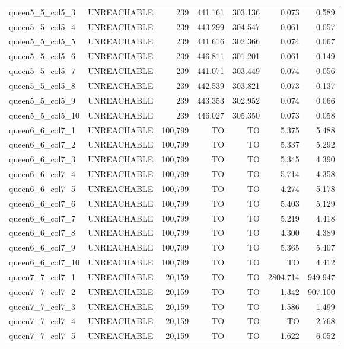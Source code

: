 \begin{tabular}{llr|rrrr}
  queen5\_5\_col5\_3 & UNREACHABLE & 239 & 441.161 & 303.136 & 0.073 & 0.589 \\
  queen5\_5\_col5\_4 & UNREACHABLE & 239 & 443.299 & 304.547 & 0.061 & 0.057 \\
  queen5\_5\_col5\_5 & UNREACHABLE & 239 & 441.616 & 302.366 & 0.074 & 0.067 \\
  queen5\_5\_col5\_6 & UNREACHABLE & 239 & 446.811 & 301.201 & 0.061 & 0.149 \\
  queen5\_5\_col5\_7 & UNREACHABLE & 239 & 441.071 & 303.449 & 0.074 & 0.056 \\
  queen5\_5\_col5\_8 & UNREACHABLE & 239 & 442.539 & 303.821 & 0.073 & 0.137 \\
  queen5\_5\_col5\_9 & UNREACHABLE & 239 & 443.353 & 302.952 & 0.074 & 0.066 \\ %
  queen5\_5\_col5\_10 & UNREACHABLE & 239 & 446.027 & 305.350 & 0.073 & 0.058 \\
  queen6\_6\_col7\_1 & UNREACHABLE & 100,799 & TO & TO & 5.375 & 5.488 \\
  queen6\_6\_col7\_2 & UNREACHABLE & 100,799 & TO & TO & 5.337 & 5.292 \\
  queen6\_6\_col7\_3 & UNREACHABLE & 100,799 & TO & TO & 5.345 & 4.390 \\
  queen6\_6\_col7\_4 & UNREACHABLE & 100,799 & TO & TO & 5.714 & 4.358 \\
  queen6\_6\_col7\_5 & UNREACHABLE & 100,799 & TO & TO & 4.274 & 5.178 \\
  queen6\_6\_col7\_6 & UNREACHABLE & 100,799 & TO & TO & 5.403 & 5.129 \\
  queen6\_6\_col7\_7 & UNREACHABLE & 100,799 & TO & TO & 5.219 & 4.418 \\
  queen6\_6\_col7\_8 & UNREACHABLE & 100,799 & TO & TO & 4.300 & 4.389 \\
  queen6\_6\_col7\_9 & UNREACHABLE & 100,799 & TO & TO & 5.365 & 5.407 \\ %
  queen6\_6\_col7\_10 & UNREACHABLE & 100,799 & TO & TO & TO & 4.412 \\
  queen7\_7\_col7\_1 & UNREACHABLE & 20,159 & TO & TO & 2804.714 & 949.947 \\
  queen7\_7\_col7\_2 & UNREACHABLE & 20,159 & TO & TO & 1.342 & 907.100 \\
  queen7\_7\_col7\_3 & UNREACHABLE & 20,159 & TO & TO & 1.586 & 1.499 \\
  queen7\_7\_col7\_4 & UNREACHABLE & 20,159 & TO & TO & TO & 2.768 \\
  queen7\_7\_col7\_5 & UNREACHABLE & 20,159 & TO & TO & 1.622 & 6.052 \\

\end{tabular}
